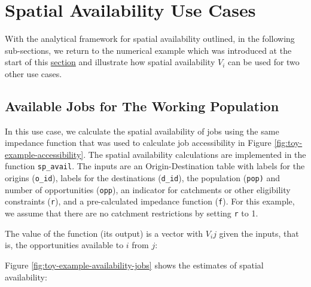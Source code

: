 \documentclass[]{elsarticle} %
\begin{document}
\hypertarget{spatial-availability-use-cases}{%
\section{Spatial Availability Use
Cases}\label{spatial-availability-use-cases}}

With the analytical framework for spatial availability outlined, in the
following sub-sections, we return to the numerical example which was
introduced at the start of this
\protect\hyperlink{accessibility-numerical-example}{section} and
illustrate how spatial availability \(V_i\) can be used for two other
use cases.

\hypertarget{available-jobs-for-the-working-population}{%
\subsection{Available Jobs for The Working
Population}\label{available-jobs-for-the-working-population}}

In this use case, we calculate the spatial availability of jobs using
the same impedance function that was used to calculate job accessibility
in Figure \ref{fig:toy-example-accessibility}. The spatial availability
calculations are implemented in the function \texttt{sp\_avail}. The
inputs are an Origin-Destination table with labels for the origins
(\texttt{o\_id}), labels for the destinations (\texttt{d\_id}), the
population (\texttt{pop)} and number of opportunities (\texttt{opp}), an
indicator for catchments or other eligibility constraints (\texttt{r}),
and a pre-calculated impedance function (\texttt{f}). For this example,
we assume that there are no catchment restrictions by setting \texttt{r}
to 1.

The value of the function (its output) is a vector with \(V_ij\) given
the inputs, that is, the opportunities available to \(i\) from \(j\):

Figure \ref{fig:toy-example-availability-jobs} shows the estimates of
spatial availability:
\end{document}
